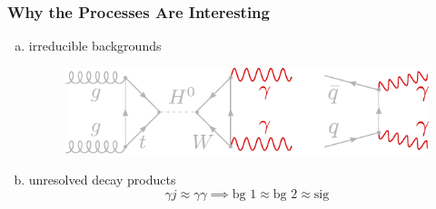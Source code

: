 \documentclass[14pt, t]{beamer}
\begin{document}
\begin{frame}
    \frametitle{Why the Processes Are Interesting}

    \begin{enumerate}[(a)]
    
        \item<1-> {\color{irrBgRed} irreducible backgrounds}
        \begin{figure}[htb!]
            \centering
            \includegraphics[width=\linewidth]{vector/figures-presentation/feynman-irr-bg.pdf}
        \end{figure}

        \item<2-> unresolved decay products
        \vspace{-3mm}
        \begin{equation*}
            \gamma j \approx \gamma \gamma \implies \text{bg 1} \approx \text{bg 2} \approx \text{sig}
        \end{equation*}
    \end{enumerate}

    \vspace{7mm}

    \vspace{-2mm}
    
\end{frame}
\end{document}
